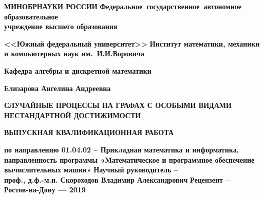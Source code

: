 \thispagestyle{empty}
\vskip1cm
\begin{center}
\textbf{МИНОБРНАУКИ РОССИИ}
\vskip14pt
\textbf{Федеральное~государственное~автономное образовательное\\учреждение
высшего образования}

\textbf{<<Южный федеральный университет>>}
\vskip14pt
\textbf{\large Институт математики, механики и компьютерных наук им.~И.И.Воровича}

\textbf{Кафедра алгебры и дискретной математики}

\vskip1.25cm
\textbf{\LARGE{Елизарова Ангелина Андреевна}}

\vskip1.25cm

\textbf{\LARGE СЛУЧАЙНЫЕ ПРОЦЕССЫ НА ГРАФАХ С ОСОБЫМИ ВИДАМИ НЕСТАНДАРТНОЙ ДОСТИЖИМОСТИ}

\vskip2cm

\textbf{ВЫПУСКНАЯ КВАЛИФИКАЦИОННАЯ РАБОТА}

\textbf{\large{по направлению 01.04.02 – Прикладная математика и информатика, 
направленность программы «Математическое и программное обеспечение вычислительных машин»}}
\vskip1cm
\textbf{Научный руководитель --\\
проф., д.ф.-м.н. Скороходов Владимир Александрович}
\vskip1cm
\textbf{Рецензент --\\
	}
\textbf{Ростов-на-Дону --- 2019}
\end{center}
\newpage
